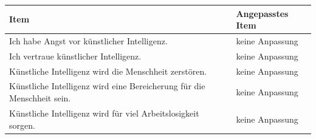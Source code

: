 \begin{center}
\begin{threeparttable}
\caption{Items für Konstrukt: XAIT}
\label{tab:XAIT}
\begin{tabularx}{\textwidth}{X X}
\toprule
\textbf{Item} & \textbf{Angepasstes Item} \\
\midrule
Ich habe Angst vor künstlicher Intelligenz. & keine Anpassung \\
Ich vertraue künstlicher Intelligenz. & keine Anpassung \\
Künstliche Intelligenz wird die Menschheit zerstören. & keine Anpassung \\
Künstliche Intelligenz wird eine Bereicherung für die Menschheit sein. & keine Anpassung \\
Künstliche Intelligenz wird für viel Arbeitslosigkeit sorgen. & keine Anpassung \\
\bottomrule
\end{tabularx}
\end{threeparttable}
\end{center}
\vspace{1em}